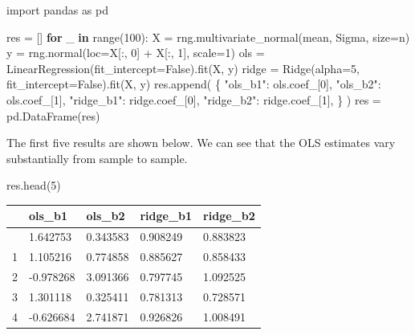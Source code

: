 \documentclass[
  letterpaper,
  DIV=11,
  numbers=noendperiod]{scrreprt}
\newenvironment{Shaded}{\begin{snugshade}}{\end{snugshade}}
\newcommand{\BuiltInTok}[1]{\textcolor[rgb]{0.00,0.23,0.31}{#1}}
\newcommand{\ControlFlowTok}[1]{\textcolor[rgb]{0.00,0.23,0.31}{\textbf{#1}}}
\newcommand{\DecValTok}[1]{\textcolor[rgb]{0.68,0.00,0.00}{#1}}
\newcommand{\ImportTok}[1]{\textcolor[rgb]{0.00,0.46,0.62}{#1}}
\newcommand{\KeywordTok}[1]{\textcolor[rgb]{0.00,0.23,0.31}{\textbf{#1}}}
\newcommand{\NormalTok}[1]{\textcolor[rgb]{0.00,0.23,0.31}{#1}}
\newcommand{\OperatorTok}[1]{\textcolor[rgb]{0.37,0.37,0.37}{#1}}
\newcommand{\StringTok}[1]{\textcolor[rgb]{0.13,0.47,0.30}{#1}}
\newcommand{\VariableTok}[1]{\textcolor[rgb]{0.07,0.07,0.07}{#1}}
\newcounter{none} %
\theoremstyle{definition}
\theoremstyle{definition}
\theoremstyle{plain}
\theoremstyle{plain}
\theoremstyle{remark}
\begin{document}
\begin{Shaded}
\begin{Highlighting}[]
\ImportTok{import}\NormalTok{ pandas }\ImportTok{as}\NormalTok{ pd}

\NormalTok{res }\OperatorTok{=}\NormalTok{ []}
\ControlFlowTok{for}\NormalTok{ \_ }\KeywordTok{in} \BuiltInTok{range}\NormalTok{(}\DecValTok{100}\NormalTok{):}
\NormalTok{    X }\OperatorTok{=}\NormalTok{ rng.multivariate\_normal(mean, Sigma, size}\OperatorTok{=}\NormalTok{n)}
\NormalTok{    y }\OperatorTok{=}\NormalTok{ rng.normal(loc}\OperatorTok{=}\NormalTok{X[:, }\DecValTok{0}\NormalTok{] }\OperatorTok{+}\NormalTok{ X[:, }\DecValTok{1}\NormalTok{], scale}\OperatorTok{=}\DecValTok{1}\NormalTok{)}
\NormalTok{    ols }\OperatorTok{=}\NormalTok{ LinearRegression(fit\_intercept}\OperatorTok{=}\VariableTok{False}\NormalTok{).fit(X, y)}
\NormalTok{    ridge }\OperatorTok{=}\NormalTok{ Ridge(alpha}\OperatorTok{=}\DecValTok{5}\NormalTok{, fit\_intercept}\OperatorTok{=}\VariableTok{False}\NormalTok{).fit(X, y)}
\NormalTok{    res.append(}
\NormalTok{        \{}
            \StringTok{"ols\_b1"}\NormalTok{: ols.coef\_[}\DecValTok{0}\NormalTok{],}
            \StringTok{"ols\_b2"}\NormalTok{: ols.coef\_[}\DecValTok{1}\NormalTok{],}
            \StringTok{"ridge\_b1"}\NormalTok{: ridge.coef\_[}\DecValTok{0}\NormalTok{],}
            \StringTok{"ridge\_b2"}\NormalTok{: ridge.coef\_[}\DecValTok{1}\NormalTok{],}
\NormalTok{        \}}
\NormalTok{    )}
\NormalTok{res }\OperatorTok{=}\NormalTok{ pd.DataFrame(res)}
\end{Highlighting}
\end{Shaded}

The first five results are shown below. We can see that the OLS
estimates vary substantially from sample to sample.

\begin{Shaded}
\begin{Highlighting}[]
\NormalTok{res.head(}\DecValTok{5}\NormalTok{)}
\end{Highlighting}
\end{Shaded}

{\def\LTcaptype{none} %
\begin{longtable}[]{@{}lllll@{}}
\toprule\noalign{}
& ols\_b1 & ols\_b2 & ridge\_b1 & ridge\_b2 \\
\midrule\noalign{}
\endhead
\bottomrule\noalign{}
\endlastfoot
0 & 1.642753 & 0.343583 & 0.908249 & 0.883823 \\
1 & 1.105216 & 0.774858 & 0.885627 & 0.858433 \\
2 & -0.978268 & 3.091366 & 0.797745 & 1.092525 \\
3 & 1.301118 & 0.325411 & 0.781313 & 0.728571 \\
4 & -0.626684 & 2.741871 & 0.926826 & 1.008491 \\
\end{longtable}
}
\end{document}
